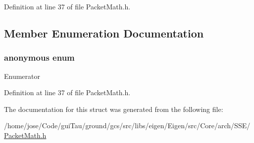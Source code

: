 Definition at line 37 of file Packet\-Math.\-h.



\subsection{Member Enumeration Documentation}
\hypertarget{structei__unpacket__traits_3_01____m128d_01_4_a81dee403e9a7f7872227d3a41ccde7c7}{\subsubsection[{anonymous enum}]{\setlength{\rightskip}{0pt plus 5cm}anonymous enum}}\label{structei__unpacket__traits_3_01____m128d_01_4_a81dee403e9a7f7872227d3a41ccde7c7}
\begin{Desc}
\item[Enumerator]\par
\begin{description}
\item[{\em 
\hypertarget{structei__unpacket__traits_3_01____m128d_01_4_a81dee403e9a7f7872227d3a41ccde7c7a9527e9b5e5d9ce47bc0594cf0aab8503}{size}\label{structei__unpacket__traits_3_01____m128d_01_4_a81dee403e9a7f7872227d3a41ccde7c7a9527e9b5e5d9ce47bc0594cf0aab8503}
}]\end{description}
\end{Desc}


Definition at line 37 of file Packet\-Math.\-h.



The documentation for this struct was generated from the following file\-:\begin{DoxyCompactItemize}
\item 
/home/jose/\-Code/gui\-Tau/ground/gcs/src/libs/eigen/\-Eigen/src/\-Core/arch/\-S\-S\-E/\hyperlink{_s_s_e_2_packet_math_8h}{Packet\-Math.\-h}\end{DoxyCompactItemize}
